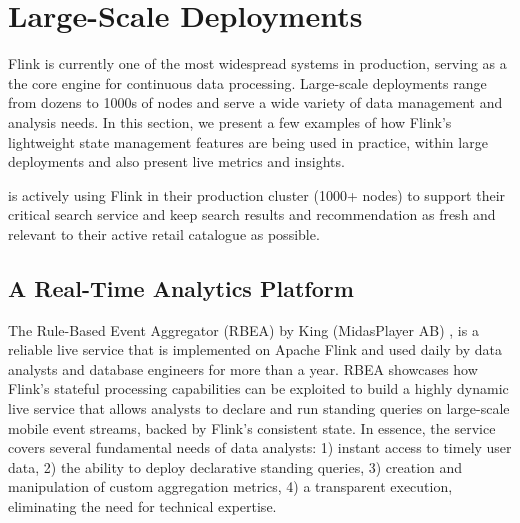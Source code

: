 \section{Large-Scale Deployments}
\label{sec:evaluation}


Flink is currently one of the most widespread systems in production, serving as a the core engine for continuous data processing. Large-scale deployments range from dozens to 1000s of nodes and serve a wide variety of data management and analysis needs. In this section, we present a few examples of how Flink's lightweight state management features are being used in practice, within large deployments and also present live metrics and insights.


 is actively using Flink in their production cluster (1000+ nodes) to support their critical search service \cite{CUSTOM:web/alibaba} and keep search results and recommendation as fresh and relevant to their active retail catalogue as possible.










\subsection{A Real-Time Analytics Platform}

The Rule-Based Event Aggregator (RBEA) by King (MidasPlayer AB) \cite{CUSTOM:web/kingrbea}, is a reliable live service that is implemented on Apache Flink and used daily by data analysts and database engineers for more than a year. RBEA showcases how Flink's stateful processing capabilities can be exploited to build a highly dynamic live service that allows analysts to declare and run standing queries on large-scale mobile event streams, backed by Flink's consistent state. In essence, the service covers several fundamental needs of data analysts: 1) instant access to timely user data, 2) the ability to deploy declarative standing queries, 3) creation and manipulation of custom aggregation metrics, 4) a transparent execution, eliminating the need for technical expertise.

